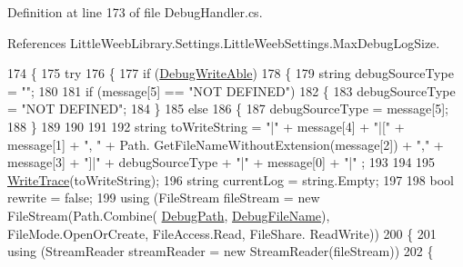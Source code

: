 Definition at line 173 of file Debug\+Handler.\+cs.



References Little\+Weeb\+Library.\+Settings.\+Little\+Weeb\+Settings.\+Max\+Debug\+Log\+Size.


\begin{DoxyCode}
174         \{           
175             \textcolor{keywordflow}{try}
176             \{
177                 \textcolor{keywordflow}{if} (\mbox{\hyperlink{class_little_weeb_library_1_1_handlers_1_1_debug_handler_a37befa26f60bbf4a6b945fb8be13977e}{DebugWriteAble}})
178                 \{
179                     \textcolor{keywordtype}{string} debugSourceType = \textcolor{stringliteral}{""};
180 
181                     \textcolor{keywordflow}{if} (message[5] == \textcolor{stringliteral}{"NOT DEFINED"})
182                     \{
183                         debugSourceType = \textcolor{stringliteral}{"NOT DEFINED"};
184                     \}
185                     \textcolor{keywordflow}{else}
186                     \{
187                         debugSourceType = message[5];
188                     \}
189 
190 
191 
192                     \textcolor{keywordtype}{string} toWriteString = \textcolor{stringliteral}{"|"} + message[4] + \textcolor{stringliteral}{"|["} + message[1] + \textcolor{stringliteral}{", "} + Path.
      GetFileNameWithoutExtension(message[2]) + \textcolor{stringliteral}{","} + message[3] + \textcolor{stringliteral}{"]|"} + debugSourceType + \textcolor{stringliteral}{"|"} + message[0] + \textcolor{stringliteral}{"|"} ;
193 
194 
195                     \mbox{\hyperlink{class_little_weeb_library_1_1_handlers_1_1_debug_handler_ade74885424ad635ba119c8c146bd7e73}{WriteTrace}}(toWriteString);
196                     \textcolor{keywordtype}{string} currentLog = \textcolor{keywordtype}{string}.Empty;
197 
198                     \textcolor{keywordtype}{bool} rewrite = \textcolor{keyword}{false};
199                     \textcolor{keyword}{using} (FileStream fileStream = \textcolor{keyword}{new} FileStream(Path.Combine(
      \mbox{\hyperlink{class_little_weeb_library_1_1_handlers_1_1_debug_handler_ac3da0e592d7c056dfeb8e60a5a5c1986}{DebugPath}}, \mbox{\hyperlink{class_little_weeb_library_1_1_handlers_1_1_debug_handler_ac6690e0052ce2a2a040a5160c60fa6d4}{DebugFileName}}), FileMode.OpenOrCreate, FileAccess.Read, FileShare.
      ReadWrite))
200                     \{
201                         \textcolor{keyword}{using} (StreamReader streamReader = \textcolor{keyword}{new} StreamReader(fileStream))
202                         \{

\end{DoxyCode}
